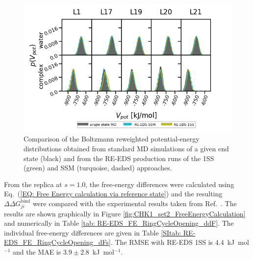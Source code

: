 \begin{figure}[h]
    \centering
    \includegraphics[width=\columnwidth]{fig/results/ringOpening/FE/RingClosure_system_final_sampling.png}
    \caption{Comparison of the Boltzmann reweighted potential-energy distributions obtained from standard MD simulations of a given end state (black) and from the RE-EDS production runs of the 1SS (green) and SSM (turquoise, dashed) approaches.}
    \label{fig:RingOpening_sampling_comparison}
\end{figure}

From the replica at $s=1.0$, the free-energy differences were calculated using Eq.~(\ref{EQ: Free Energy calculation via reference state}) and the resulting $\Delta \Delta G^\text{bind}_{ji}$ were compared with the experimental results taken from Ref.~\cite{Huang2012}. The results are shown graphically in Figure \ref{fig:CHK1_set2_FreeEnergyCalculation} and numerically in Table \ref{tab: RE-EDS_FE_RingCycleOpening_ddF}. The individual free-energy differences are given in Table \ref{SItab: RE-EDS_FE_RingCycleOpening_dFs}.
The RMSE with RE-EDS 1SS is $4.4$~kJ~mol$^{-1}$ and the MAE is $3.9\pm2.8$~kJ~mol$^{-1}$. 

